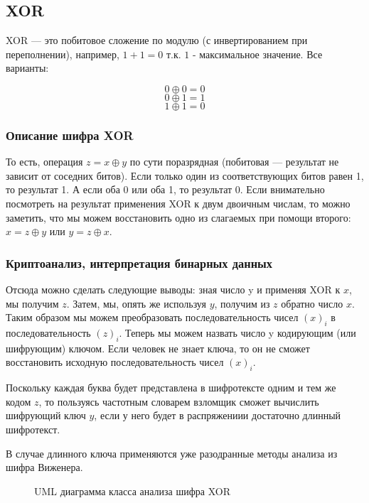 \subsection{XOR}

XOR --- это побитовое сложение по модулю (с инвертированием при переполнении), 
например, $1+1=0$ т.к. $1$ - максимальное значение. Все варианты:

$$0 \oplus 0=0$$
$$0 \oplus 1=1$$
$$1 \oplus 1=0$$

\subsubsection{Описание шифра XOR}

То есть, операция $z = x \oplus y$ по сути поразрядная (побитовая — 
результат не зависит от соседних битов). Если только один из 
соответствующих битов равен 1, то результат 1. А если оба 0 или 
оба 1, то результат 0. Если внимательно посмотреть на результат 
применения XOR к двум двоичным числам, то можно заметить, что 
мы можем восстановить одно из слагаемых при помощи второго: $x 
= z \oplus y$ или $y = z \oplus x$. 

\subsubsection{Криптоанализ, интерпретация бинарных данных}

Отсюда можно сделать следующие выводы: зная число y и применяя 
XOR к $x$, мы получим $z$. Затем, мы, опять же используя $y$, получим 
из $z$ обратно число $x$. Таким образом мы можем преобразовать последовательность 
чисел $(x)_i$ в последовательность $(z)_i$. Теперь мы можем назвать 
число y кодирующим (или шифрующим) ключом. Если человек не знает 
ключа, то он не сможет восстановить исходную последовательность 
чисел $(x)_i$.

Поскольку каждая буква будет представлена в шифротексте 
одним и тем же кодом $z$, то пользуясь частотным словарем взломщик 
сможет вычислить шифрующий ключ $y$, если у него будет в распряжениии 
достаточно длинный шифротекст. 

В случае длинного ключа применяются уже разодранные методы 
анализа из шифра Виженера.

\begin{figure}[H]
\noindent{}
\caption{UML диаграмма класса анализа шифра XOR}
\label{figXOR}
\end{figure}
